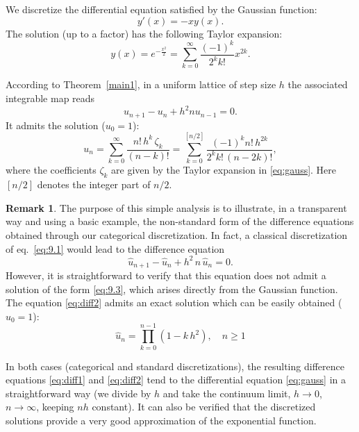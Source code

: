 \documentclass[10pt]{amsart}
\numberwithin{equation}{section}
\theoremstyle{definition}
\newtheorem{remark}{\textbf{Remark}}
\begin{document}
 We discretize the differential equation satisfied by the Gaussian function:
\begin{equation}
\label{eq:9.1}
y'(x)=-x y(x).
\end{equation}
The solution (up to a factor) has the following Taylor expansion:
\begin{equation}
\label{eq:gauss}
y(x)=e^{-\frac{x^{2}}{2}}=\sum _{k=0}^{\infty}
\frac{(-1)^{k}}{2^{k}k!}x^{2k}.
\end{equation}

According to  Theorem~\ref{main1}, in a uniform lattice of step size
$h$ the associated integrable map reads
\begin{equation}
\label{eq:diff1}
u_{n+1}-u_{n}+h^{2} nu_{n-1}=0.
\end{equation}
It admits the solution ($u_{0}=1$):
\begin{equation}
\label{eq:9.3}
u_{n}=\sum _{k=0}^{\infty}\frac{n!\,h^{k}\,\zeta _{k}}{(n-k)!}=\sum _{k=0}^{[n/2]}
\frac{(-1)^{k} n!\, h^{2 k}}{2^{k} k!\,(n-2 k)!},
\end{equation}
where the coefficients $\zeta _{k}$ are given by the Taylor expansion in  \eqref{eq:gauss}. Here $[n/2]$ denotes the integer part of $n/2$.

\begin{remark}
\label{rem7}
The purpose of this simple analysis is to illustrate, in a transparent
way and using a basic example, the non-standard form of the difference
equations obtained through our categorical discretization. In fact, a classical
discretization of eq.~\eqref{eq:9.1} would lead to the difference equation
\begin{equation}
\label{eq:diff2}
\hat{u}_{n+1}-\hat{u}_{n}+h^{2}\,n\,\hat{u}_{n}=0.
\end{equation}
However, it is straightforward to verify that this equation does not admit
a solution of the form  \eqref{eq:9.3}, which arises directly from the Gaussian
function. The equation  \eqref{eq:diff2} admits an exact solution which
can be easily obtained ($\hat{u}_{0}=1$):
\begin{equation}
\hat{u}_{n}=\prod _{k=0}^{n-1}(1-k\,h^{2}),\quad n\ge 1
\label{eq10.14}
\end{equation}

In both cases (categorical and standard discretizations), the resulting
difference equations  \eqref{eq:diff1} and  \eqref{eq:diff2} tend to the
differential equation  \eqref{eq:gauss} in a straightforward way (we divide
by $h$ and take the continuum limit, $h\to 0$, $n\to \infty $, keeping
$n h$ constant). It can also be verified that the discretized solutions
provide a very good approximation of the exponential function.
\end{remark}
\end{document}
